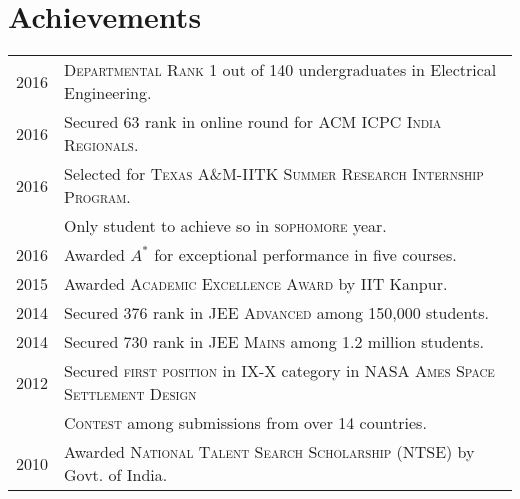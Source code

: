 \documentclass[a4paper,10pt]{article}
\begin{document}
\section{Achievements}
\begin{tabular}{rl}
2016 & \textsc{Departmental Rank 1} out of 140 undergraduates in Electrical
Engineering.\\
2016 & Secured 63 rank in online round for \textsc{ACM ICPC India Regionals}.\\
2016 & Selected for \textsc{Texas A\&M-IITK Summer Research Internship Program}.\\ 
& Only student to achieve so in \textsc{sophomore} year.\\
2016 & Awarded $A^*$ for exceptional performance in five courses.\\
2015 & Awarded \textsc{Academic Excellence Award} by IIT Kanpur.\\
2014 & Secured 376 rank in \textsc{JEE Advanced} among 150,000 students.\\
2014 & Secured 730 rank in \textsc{JEE Mains} among 1.2 million students. \\
2012 & Secured \textsc{first position} in IX-X category in \textsc{NASA Ames Space Settlement Design}\\
&\textsc{Contest} among submissions from over 14 countries.\\
2010 & Awarded \textsc{National Talent Search Scholarship} (NTSE) by Govt. of India.

\end{tabular}
\end{document}
